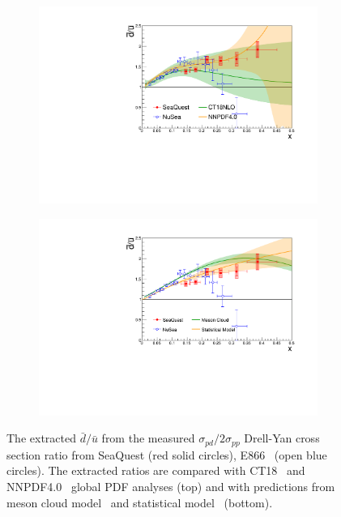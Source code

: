 \documentclass[reprint,aps,unsortedaddress,superscriptaddress,prl,floatfix,showpacs,linenumbers]{revtex4-2}
\begin{document}
\begin{figure}[htpb!]
	\centering
	\begin{subfigure}{\linewidth}
		\includegraphics[width=\linewidth]{E906_E866_dbarubar_PDF.pdf}
	\end{subfigure}
	\begin{subfigure}{\linewidth}
		\includegraphics[width=\linewidth]{E906_E866_dbarubar.pdf}
	\end{subfigure}
	\caption{The extracted $\bar{d}/\bar{u}$ from the measured $\sigma_{pd}/2\sigma_{pp}$ Drell-Yan cross section ratio
		from SeaQuest (red solid circles), E866~\cite{towell2001} (open blue circles).
		The extracted ratios are compared with CT18~\cite{hou2021} and NNPDF4.0~\cite{ball2022a} global PDF analyses (top)
		and with predictions from meson cloud model~\cite{alberg2022} and statistical model~\cite{soffer2019} (bottom).}
	\label{fig:e906_e866_dbarubar}
\end{figure}
\end{document}
